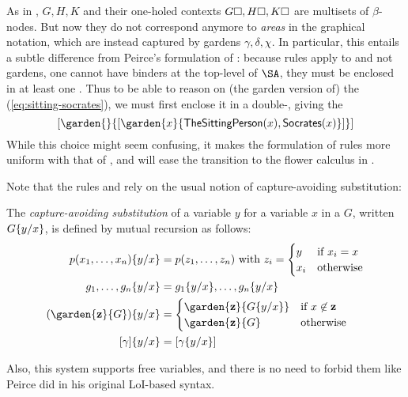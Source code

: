 \begin{scope}
\begin{remark}
  As in ,  $G, H, K$ and their one-holed contexts
  $G\square, H\square, K\square$ are multisets of $\beta$-nodes. But now they do not
  correspond anymore to \emph{areas} in the graphical notation, which are
  instead captured by gardens $\gamma, \delta, \chi$. In particular, this
  entails a subtle difference from Peirce's formulation of : because
  rules apply to  and not gardens, one cannot have binders at the
  top-level of $\SA$, they must be enclosed in at least one . Thus to be able
  to reason on (the garden version of) the  (\ref{eq:sitting-socrates}), we
  must first enclose it in a double-, giving the 
  $$[\garden{{}}{[\garden{x}{\mathsf{TheSittingPerson}(x),\mathsf{Socrates}(x)}]}]$$
  While this choice might seem confusing, it makes the formulation of rules more
  uniform with that of , and will ease the transition to the flower
  calculus in .
\end{remark}

Note that the rules  and  rely on the usual notion
of capture-avoiding substitution:

\begin{definition}[Substitution]
  The \emph{capture-avoiding substitution} of a variable $y$ for a variable $x$
  in a  $G$, written $G \{ y / x \}$, is defined by mutual
  recursion as follows:
  \begin{align*}
    \subst{p(x_1,\ldots,x_n)}{y}{x} &= p(z_1, \ldots, z_n) \text{ with } z_i = \begin{cases}
      y &\text{if $x_i = x$} \\
      x_i &\text{otherwise}
    \end{cases} \\
    \subst{g_1, \ldots, g_n}{y}{x} &= \subst{g_1}{y}{x}, \ldots, \subst{g_n}{y}{x} \\
    \subst{(\garden{\bz}{G})}{y}{x} &= \begin{cases}
      \garden{\bz}{\subst{G}{y}{x}} &\text{if $x \not\in \bz$} \\
      \garden{\bz}{G} &\text{otherwise}
    \end{cases} \\
    \subst{[\gamma]}{y}{x} &= [\subst{\gamma}{y}{x}]
  \end{align*}
\end{definition}

Also, this system supports free variables, and there is no need to forbid them
like Peirce did in his original LoI-based syntax.

\end{scope}